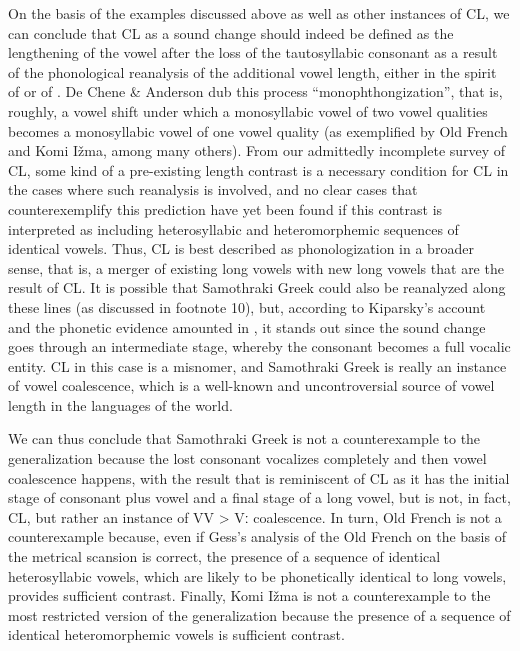 \documentclass[output=paper,
modfonts
]{LSP/langsci}
\begin{document}
On the basis of the examples discussed above as well as other instances
of CL, we can conclude that CL as a sound change should indeed be
defined as the lengthening of the vowel after the loss of the
tautosyllabic consonant as a result of the phonological reanalysis of
the additional vowel length, either in the spirit of \citet{deChene1979} or of \citet{kavitskaya2002}. De Chene \& Anderson \citeyearpar{deChene1979}
dub this process ``monophthongization'', that is, roughly, a vowel shift
under which a monosyllabic vowel of two vowel qualities becomes a
monosyllabic vowel of one vowel quality (as exemplified by Old French
and Komi Ižma, among many others). From our admittedly incomplete survey
of CL, some kind of a pre-existing length contrast is a necessary
condition for CL in the cases where such reanalysis is involved, and no
clear cases that counterexemplify this prediction have yet been found if
this contrast is interpreted as including heterosyllabic and
heteromorphemic sequences of identical vowels. Thus, CL is best
described as phonologization in a broader sense, that is, a merger of
existing long vowels with new long vowels that are the result of CL. It
is possible that Samothraki Greek could also be reanalyzed along these
lines (as discussed in footnote 10), but, according to Kiparsky's \citeyearpar{kiparsky2011k}
account and the phonetic evidence amounted in \citet{katsika2015}, it stands out since the sound change goes through an
intermediate stage, whereby the consonant becomes a full vocalic entity.
CL in this case is a misnomer, and Samothraki Greek is really an
instance of vowel coalescence, which is a well-known and uncontroversial
source of vowel length in the languages of the world.

We can thus conclude that Samothraki Greek is not a counterexample to
the generalization because the lost consonant vocalizes completely and
then vowel coalescence happens, with the result that is reminiscent of
CL as it has the initial stage of consonant plus vowel and a final stage
of a long vowel, but is not, in fact, CL, but rather an instance of VV
\textgreater{} Vː coalescence. In turn, Old French is not a
counterexample because, even if Gess's analysis of the Old French on the
basis of the metrical scansion is correct, the presence of a sequence of
identical heterosyllabic vowels, which are likely to be phonetically
identical to long vowels, provides sufficient contrast. Finally, Komi
Ižma is not a counterexample to the most restricted version of the
generalization because the presence of a sequence of identical
heteromorphemic vowels is sufficient contrast.
\end{document}
